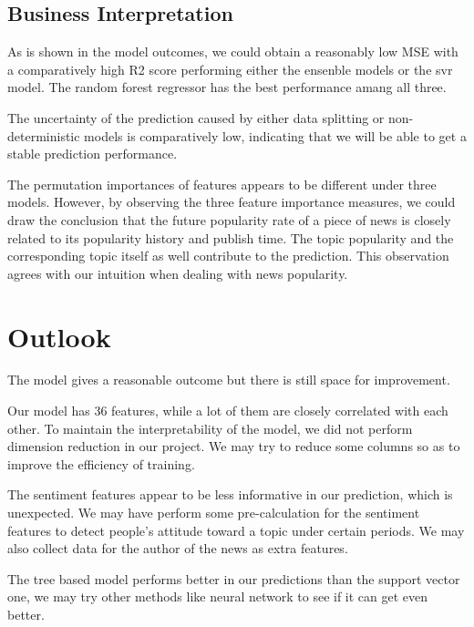 \documentclass{article}
\begin{document}
\subsection{Business Interpretation}

As is shown in the model outcomes, we could obtain a reasonably low MSE with a comparatively high R2 score performing either the ensenble models or the svr model. The random forest regressor has the best performance amang all three.\par
The uncertainty of the prediction caused by either data splitting or non-deterministic models is comparatively low, indicating that we will be able to get a stable prediction performance.\par
The permutation importances of features appears to be different under three models. However, by observing the three feature importance measures, we could draw the conclusion that the future popularity rate of a piece of news is closely related to its popularity history and publish time. The topic popularity and the corresponding topic itself as well contribute to the prediction. This observation agrees with our intuition when dealing with news popularity.

\section{Outlook}

The model gives a reasonable outcome but there is still space for improvement.\par
Our model has 36 features, while a lot of them are closely correlated with each other. To maintain the interpretability of the model, we did not perform dimension reduction in our project. We may try to reduce some columns so as to improve the efficiency of training.\par
The sentiment features appear to be less informative in our prediction, which is unexpected. We may have perform some pre-calculation for the sentiment features to detect people's attitude toward a topic under certain periods. We may also collect data for the author of the news as extra features.\par
The tree based model performs better in our predictions than the support vector one, we may try other methods like neural network to see if it can get even better.
\end{document}
